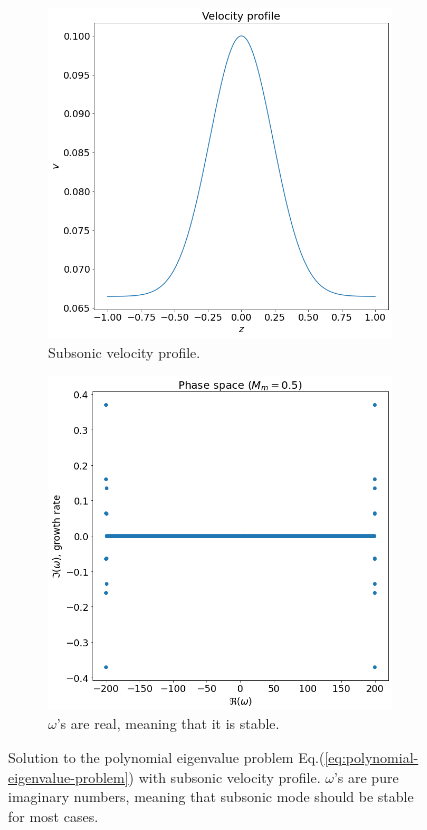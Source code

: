 \documentclass{article}
\theoremstyle{plain}
\theoremstyle{definition}
\theoremstyle{remark}
\theoremstyle{remark}
\begin{document}
\begin{figure}[H]
    \centering
    \begin{subfigure}[b]{0.5\linewidth}
        \includegraphics[width=\linewidth]{img/velocity-profile-subsonic.png}
        \caption{Subsonic velocity profile.}
    \end{subfigure}%
    \begin{subfigure}[b]{0.5\linewidth}
        \includegraphics[width=\linewidth]{img/phase-space-subsonic.png}
        \caption{$\omega$'s are real, meaning that it is stable.}
    \end{subfigure}
    \caption{Solution to the polynomial eigenvalue problem Eq.(\ref{eq:polynomial-eigenvalue-problem}) with subsonic velocity profile. $\omega$'s are pure imaginary numbers, meaning that subsonic mode should be stable for most cases.}
    \label{fig:subsonic}
\end{figure}
\end{document}
